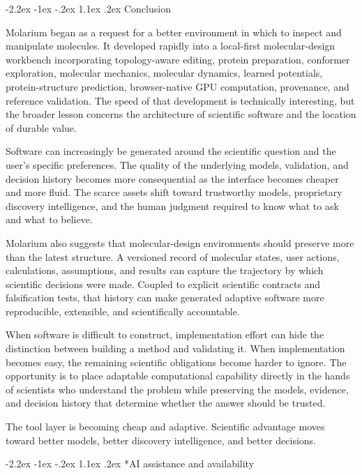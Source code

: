 \documentclass[11pt]{article}
\makeatletter
\renewcommand\section{\@startsection{section}{1}{\z@}%
  {-2.2ex \@plus -1ex \@minus -.2ex}%
  {1.1ex \@plus .2ex}%
  {\normalfont\Large\bfseries\color{molblue}}}
\makeatother
\begin{document}
\section{Conclusion}

Molarium began as a request for a better environment in which to inspect and manipulate molecules. It developed rapidly into a local-first molecular-design workbench incorporating topology-aware editing, protein preparation, conformer exploration, molecular mechanics, molecular dynamics, learned potentials, protein-structure prediction, browser-native GPU computation, provenance, and reference validation. The speed of that development is technically interesting, but the broader lesson concerns the architecture of scientific software and the location of durable value.

Software can increasingly be generated around the scientific question and the user's specific preferences. The quality of the underlying models, validation, and decision history becomes more consequential as the interface becomes cheaper and more fluid. The scarce assets shift toward trustworthy models, proprietary discovery intelligence, and the human judgment required to know what to ask and what to believe.

Molarium also suggests that molecular-design environments should preserve more than the latest structure. A versioned record of molecular states, user actions, calculations, assumptions, and results can capture the trajectory by which scientific decisions were made. Coupled to explicit scientific contracts and falsification tests, that history can make generated adaptive software more reproducible, extensible, and scientifically accountable.

When software is difficult to construct, implementation effort can hide the distinction between building a method and validating it. When implementation becomes easy, the remaining scientific obligations become harder to ignore. The opportunity is to place adaptable computational capability directly in the hands of scientists who understand the problem while preserving the models, evidence, and decision history that determine whether the answer should be trusted.

The tool layer is becoming cheap and adaptive. Scientific advantage moves toward better models, better discovery intelligence, and better decisions.

\section*{AI assistance and availability}
\end{document}
